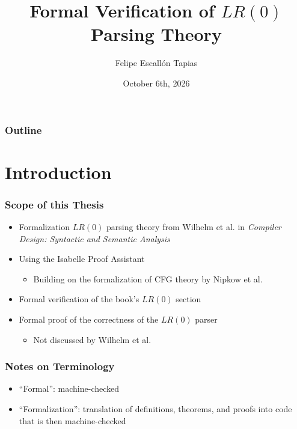 \documentclass{beamer}
\title{Formal Verification of $LR(0)$ Parsing Theory}
\author[Felipe Escall\'{o}n]{Felipe Escall\'{o}n Tapias}
\institute[TUM]{Technical University of Munich}
\date{October 6th, 2026}
\begin{document}
\begin{frame}
  \titlepage
\end{frame}

\begin{frame}
\frametitle{Outline}
\tableofcontents[hideallsubsections]
\end{frame}

\section{Introduction}

\begin{frame}
\frametitle{Scope of this Thesis}
\begin{itemize}
  \item Formalization $LR(0)$ parsing theory from Wilhelm et al. in 
    \textit{Compiler Design: Syntactic and Semantic Analysis}
  \item Using the Isabelle Proof Assistant
  \begin{itemize}
    \item Building on the formalization of CFG theory by Nipkow et al.
  \end{itemize}
\end{itemize}
\begin{itemize}
  \item Formal verification of the book's $LR(0)$ section
  \item Formal proof of the correctness of the $LR(0)$ parser 
  \begin{itemize}
    \item Not discussed by Wilhelm et al.
  \end{itemize}
\end{itemize}
\end{frame}


\begin{frame}
\frametitle{Notes on Terminology}
\begin{itemize}
\item ``Formal'': machine-checked
\item ``Formalization'': translation of definitions, theorems, and proofs into 
code that is then machine-checked
\end{itemize}
\end{frame}
\end{document}
